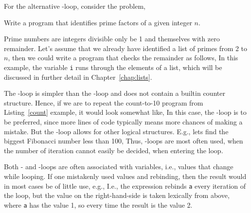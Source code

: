 For the alternative -loop, consider the problem,
\begin{problem}
  Write a program that identifies prime factors of a given integer $n$.
\end{problem}
Prime numbers are integers divisible only be 1 and themselves with zero remainder. Let's assume that we already have identified a list of primes from 2 to $n$, then we could write a program that checks the remainder as follows,
%
%
In this example, the variable \lstinline!i! runs through the elements of a list, which will be discussed in further detail in Chapter~\ref{chap:lists}.

The -loop is simpler than the -loop and does not contain a builtin counter structure. Hence, if we are to repeat the count-to-10 program from Listing~\ref{count} example, it would look somewhat like,
%
%
In this case, the -loop is to be preferred, since more lines of code typically means more chances of making a mistake. But the -loop allows for other logical structures. E.g., lets find the biggest Fibonacci number less than 100,
%
%
Thus, -loops are most often used, when the number of iteration cannot easily be decided, when entering the loop.

Both - and -loops are often associated with variables, i.e., values that change while looping. If one mistakenly used values and rebinding, then the result would in most cases be of little use, e.g.,
%
%
I.e., the  expression rebinds \lstinline!a! every iteration of the loop, but the value on the right-hand-side is taken lexically from above, where \lstinline!a! has the value 1, so every time the result is the value 2.

